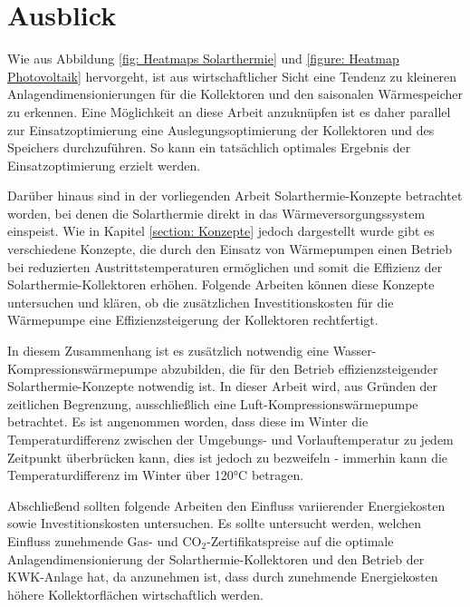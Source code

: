 \section{Ausblick}
Wie aus Abbildung \ref{fig: Heatmaps Solarthermie} und \ref{figure: Heatmap Photovoltaik} hervorgeht, ist aus wirtschaftlicher Sicht eine Tendenz zu kleineren Anlagendimensionierungen für die Kollektoren und den saisonalen Wärmespeicher zu erkennen. Eine Möglichkeit an diese Arbeit anzuknüpfen ist es daher parallel zur Einsatzoptimierung eine Auslegungsoptimierung der Kollektoren und des Speichers durchzuführen. So kann ein tatsächlich optimales Ergebnis der Einsatzoptimierung erzielt werden. 

Darüber hinaus sind in der vorliegenden Arbeit Solarthermie-Konzepte betrachtet worden, bei denen die Solarthermie direkt in das Wärmeversorgungssystem einspeist. Wie in Kapitel \ref{section: Konzepte} jedoch dargestellt wurde gibt es verschiedene Konzepte, die durch den Einsatz von Wärmepumpen einen Betrieb bei reduzierten Austrittstemperaturen ermöglichen und somit die Effizienz der Solarthermie-Kollektoren erhöhen. Folgende Arbeiten können diese Konzepte untersuchen und klären, ob die zusätzlichen Investitionskosten für die Wärmepumpe eine Effizienzsteigerung der Kollektoren rechtfertigt. 

In diesem Zusammenhang ist es zusätzlich notwendig eine Wasser-Kompressionswärmepumpe abzubilden, die für den Betrieb effizienzsteigender Solarthermie-Konzepte notwendig ist. In dieser Arbeit wird, aus Gründen der zeitlichen Begrenzung, ausschließlich eine Luft-Kompressionswärmepumpe betrachtet. Es ist angenommen worden, dass diese im Winter die Temperaturdifferenz zwischen der Umgebungs- und Vorlauftemperatur zu jedem Zeitpunkt überbrücken kann, dies ist jedoch zu bezweifeln - immerhin kann die Temperaturdifferenz im Winter über 120°C betragen.

Abschließend sollten folgende Arbeiten den Einfluss variierender Energiekosten sowie Investitionskosten untersuchen. Es sollte untersucht werden, welchen Einfluss zunehmende Gas- und CO$_2$-Zertifikatspreise auf die optimale Anlagendimensionierung der Solarthermie-Kollektoren und den Betrieb der \ac{KWK}-Anlage hat, da anzunehmen ist, dass durch zunehmende
Energiekosten höhere Kollektorflächen wirtschaftlich werden.
